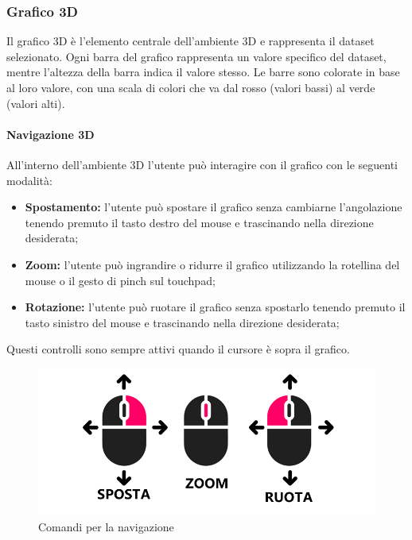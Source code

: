 \subsubsection{Grafico 3D}
Il grafico 3D è l'elemento centrale dell'ambiente 3D e rappresenta il dataset
selezionato. Ogni barra del grafico rappresenta un valore specifico del
dataset, mentre l'altezza della barra indica il valore stesso. Le barre sono
colorate in base al loro valore, con una scala di colori che va dal rosso
(valori bassi) al verde (valori alti).

\paragraph{Navigazione 3D}
All’interno dell'ambiente 3D l'utente può interagire con il grafico con le
seguenti modalità:
\begin{itemize}
    \item \textbf{Spostamento:} l'utente può spostare il grafico senza cambiarne
          l'angolazione tenendo premuto il tasto destro del mouse e trascinando
          nella direzione desiderata;
    \item \textbf{Zoom:} l'utente può ingrandire o ridurre il grafico
          utilizzando la rotellina del mouse o il gesto di pinch sul touchpad;
    \item \textbf{Rotazione:} l'utente può ruotare il grafico senza spostarlo
          tenendo premuto il tasto sinistro del mouse e trascinando nella direzione desiderata;
\end{itemize}
Questi controlli sono sempre attivi quando il cursore è sopra il grafico.
\begin{figure}[ht!]
    \centering
    \includegraphics[scale=0.6]{template/images/comandi.png}
    \caption{Comandi per la navigazione}
\end{figure}

